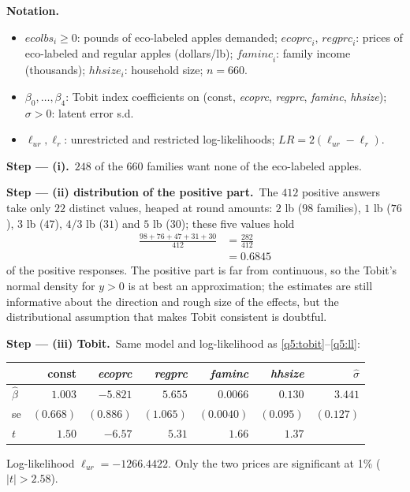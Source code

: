 \documentclass[11pt,a4paper]{article}
\numberwithin{equation}{questao}
\newenvironment{notacao}{\par\smallskip\noindent\textbf{Notation.}\begin{itemize}[leftmargin=1.4em,topsep=1pt,itemsep=0pt]\small}{\end{itemize}}
\newcommand{\passo}[2]{\par\smallskip\noindent\textbf{Step --- #1.}~#2}
\newcommand{\var}[1]{\mathit{#1}}
\begin{document}
\begin{sol}
\begin{notacao}
\item $\var{ecolbs}_i\ge0$: pounds of eco-labeled apples demanded; $\var{ecoprc}_i$, $\var{regprc}_i$: prices of eco-labeled and regular apples (dollars/lb); $\var{faminc}_i$: family income (thousands); $\var{hhsize}_i$: household size; $n=660$.
\item $\beta_0,\dots,\beta_4$: Tobit index coefficients on (const, \textit{ecoprc}, \textit{regprc}, \textit{faminc}, \textit{hhsize}); $\sigma>0$: latent error s.d.
\item $\ell_{ur},\ell_r$: unrestricted and restricted log-likelihoods; $LR=2(\ell_{ur}-\ell_r)$.
\end{notacao}

\passo{(i)}{$248$ of the $660$ families want none of the eco-labeled apples.}

\passo{(ii) distribution of the positive part}{The $412$ positive answers take only $22$ distinct
values, heaped at round amounts: $2$ lb ($98$ families), $1$ lb ($76$), $3$ lb ($47$), $4/3$ lb ($31$) and $5$
lb ($30$); these five values hold
\begin{align*}
\frac{98+76+47+31+30}{412}&=\frac{282}{412}\\
&=0.6845
\end{align*}
of the positive responses. The positive part is far from continuous, so the Tobit's normal density for
$y>0$ is at best an approximation; the estimates are still informative about the direction and rough
size of the effects, but the distributional assumption that makes Tobit consistent is doubtful.}

\passo{(iii) Tobit}{Same model and log-likelihood as \eqref{q5:tobit}--\eqref{q5:ll}:
\begin{center}\small
\begin{tabular}{lrrrrrr}
\toprule
 & const & \textit{ecoprc} & \textit{regprc} & \textit{faminc} & \textit{hhsize} & $\hat\sigma$\\
\midrule
$\hat\beta$ & $1.003$ & $-5.821$ & $5.655$ & $0.0066$ & $0.130$ & $3.441$\\
se & $(0.668)$ & $(0.886)$ & $(1.065)$ & $(0.0040)$ & $(0.095)$ & $(0.127)$\\
$t$ & $1.50$ & $-6.57$ & $5.31$ & $1.66$ & $1.37$ & \\
\bottomrule
\end{tabular}
\end{center}
Log-likelihood $\ell_{ur}=-1266.4422$. Only the two prices are significant at 1\% ($|t|>2.58$).}


\end{sol}
\end{document}
